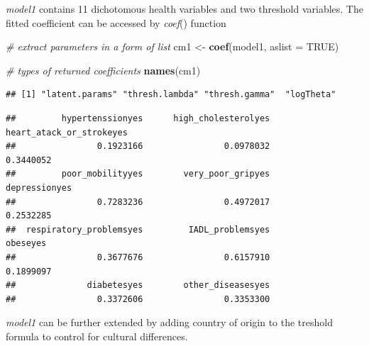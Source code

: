 \documentclass[]{article}
\newenvironment{Shaded}{\begin{snugshade}}{\end{snugshade}}
\newcommand{\CommentTok}[1]{\textcolor[rgb]{0.56,0.35,0.01}{\textit{#1}}}
\newcommand{\DataTypeTok}[1]{\textcolor[rgb]{0.13,0.29,0.53}{#1}}
\newcommand{\KeywordTok}[1]{\textcolor[rgb]{0.13,0.29,0.53}{\textbf{#1}}}
\newcommand{\NormalTok}[1]{#1}
\newcommand{\OperatorTok}[1]{\textcolor[rgb]{0.81,0.36,0.00}{\textbf{#1}}}
\newcommand{\OtherTok}[1]{\textcolor[rgb]{0.56,0.35,0.01}{#1}}
\newcommand{\StringTok}[1]{\textcolor[rgb]{0.31,0.60,0.02}{#1}}
\begin{document}
\emph{model1} contains 11 dichotomous health variables and two threshold
variables. The fitted coefficient can be accessed by \emph{coef}()
function

\begin{Shaded}
\begin{Highlighting}[]
\CommentTok{# extract parameters in a form of list}
\NormalTok{cm1 <-}\StringTok{ }\KeywordTok{coef}\NormalTok{(model1, }\DataTypeTok{aslist =} \OtherTok{TRUE}\NormalTok{)}

\CommentTok{# types of returned coefficients}
\KeywordTok{names}\NormalTok{(cm1)}
\end{Highlighting}
\end{Shaded}

\begin{verbatim}
## [1] "latent.params" "thresh.lambda" "thresh.gamma"  "logTheta"
\end{verbatim}

\begin{Shaded}
\end{Shaded}

\begin{verbatim}
##         hypertenssionyes      high_cholesterolyes heart_atack_or_strokeyes 
##                0.1923166                0.0978032                0.3440052 
##         poor_mobilityyes        very_poor_gripyes            depressionyes 
##                0.7283236                0.4972017                0.2532285 
##  respiratory_problemsyes         IADL_problemsyes                 obeseyes 
##                0.3677676                0.6157910                0.1899097 
##              diabetesyes        other_diseasesyes 
##                0.3372606                0.3353300
\end{verbatim}

\emph{model1} can be further extended by adding country of origin to the
treshold formula to control for cultural differences.
\end{document}
